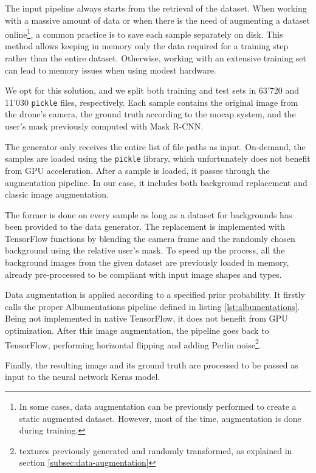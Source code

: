 The input pipeline always starts from the retrieval of the dataset. When working with a massive amount of data or when there is the need of augmenting a dataset online\footnote{In some cases, data augmentation can be previously performed to create a static augmented dataset. However, most of the time, augmentation is done during training.}, a common practice is to save each sample separately on disk. This method allows keeping in memory only the data required for a training step rather than the entire dataset. Otherwise, working with an extensive training set can lead to memory issues when using modest hardware.

We opt for this solution, and we split both training and test sets in 63'720 and 11'030 \texttt{pickle} files, respectively. Each sample contains the original image from the drone's camera, the ground truth according to the \gls{mocap} system, and the user's mask previously computed with Mask R-CNN.

\medskip

The generator only receives the entire list of file paths as input. On-demand, the samples are loaded using the \texttt{pickle} library, which unfortunately does not benefit from GPU acceleration. After a sample is loaded, it passes through the augmentation pipeline. In our case, it includes both background replacement and classic image augmentation. 

The former is done on every sample as long as a dataset for backgrounds has been provided to the data generator. The replacement is implemented with TensorFlow functions by blending the camera frame and the randomly chosen background using the relative user's mask. To speed up the process, all the background images from the given dataset are previously loaded in memory, already pre-processed to be compliant with input image shapes and types.

Data augmentation is applied according to a specified prior probability. It firstly calls the proper Albumentations pipeline defined in listing \ref{lst:albumentations}. Being not implemented in native TensorFlow, it does not benefit from GPU optimization. After this image augmentation, the pipeline goes back to TensorFlow, performing horizontal flipping and adding Perlin noise\footnote{textures previously generated and randomly transformed, as explained in section \ref{subsec:data-augmentation}}. 

Finally, the resulting image and its ground truth are processed to be passed as input to the neural network Keras model.



